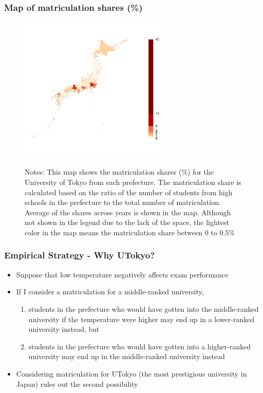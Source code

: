 \documentclass[10pt, pdfmx,hiresbb]{beamer}
\begin{document}
\begin{frame}\frametitle{Map of matriculation shares (\%)}
  \begin{center}
    \begin{figure}
      \includegraphics[width=7cm]{../Output/images/admission_map.pdf}
      \tiny
      \begin{tablenotes}
      \item Notes:
        This map shows the matriculation shares (\%) for the University of Tokyo from each prefecture.
        The matriculation share is calculated based on the ratio of the number of students from high schools in the prefecture to the total number of matriculation.
        Average of the shares across years is shown in the map.
        Although not shown in the legend due to the lack of the space, the lightest color in the map means the matriculation share between 0 to 0.5\% 
      \end{tablenotes}
    \end{figure}
  \end{center}
\end{frame}

\begin{frame}\frametitle{Empirical Strategy - Why UTokyo?}
  \begin{itemize}
    \item Suppose that low temperature negatively affects exam performance
    \item If I consider a matriculation for a middle-ranked university,
      \begin{enumerate}
        \item students in the prefecture who would have gotten into the middle-ranked university if the temperature were higher may end up in a lower-ranked university instead, but
        \item students in the prefecture who would have gotten into a higher-ranked university may end up in the middle-ranked university instead
      \end{enumerate}
    \item Considering matriculation for UTokyo (the most prestigious university in Japan) rules out the second possibility
  \end{itemize}
\end{frame}
\end{document}
